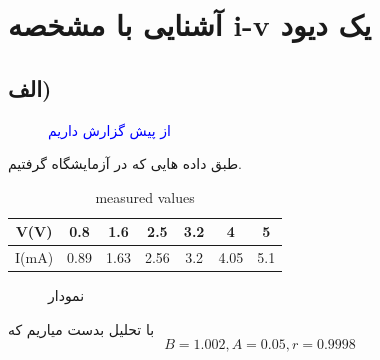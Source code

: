 \section{آشنایی با مشخصه i-v یک دیود}

\subsection{الف)}
\begin{figure}[h]
    \centering
    \caption{\textcolor{blue}{از پیش گزارش داریم}}
\end{figure}
طبق داده هایی که در آزمایشگاه گرفتیم.\\
\begin{latin}
    \begin{table}[h]
        \centering
        \begin{tabular}{|c|c|c|c|c|c|c|}
            \hline
            V(V)  & 0.8  & 1.6  & 2.5  & 3.2 & 4    & 5   \\
            \hline
            I(mA) & 0.89 & 1.63 & 2.56 & 3.2 & 4.05 & 5.1 \\
            \hline
        \end{tabular}
        \caption{measured values}
    \end{table}
\end{latin}
\begin{figure}[h]
    \centering
    \caption{نمودار}
\end{figure}
با تحلیل بدست میاریم که $$B=1.002,A=0.05,r=0.9998$$
\pagebreak
